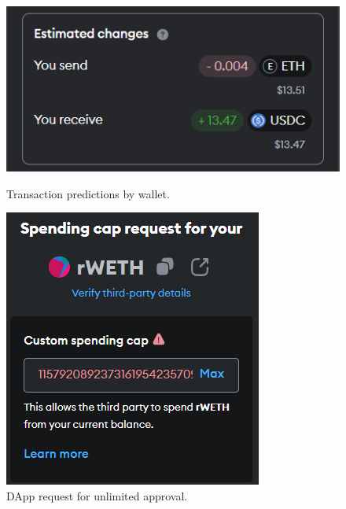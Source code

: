 \documentclass[conference]{IEEEtran}
\begin{document}
\begin{figure}[tb]
\centering
\begin{minipage}{0.48\columnwidth}
	\centering
	\includegraphics[width=0.8\columnwidth]{screenshots/trx-predicted-changes}
	\caption{Transaction predictions by wallet.}
	\label{figTrxPredictions}
\end{minipage}
\hfill
\begin{minipage}{0.48\columnwidth}
	\centering
	\includegraphics[width=0.6\columnwidth]{screenshots/unlimited-approval}
	\caption{DApp request for unlimited approval.}
	\label{figUnlimitedApproval}
\end{minipage}
\end{figure}




\end{document}

